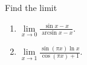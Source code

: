 Find the limit
\begin{enumerate}
\item $\lim\limits_{x\to 0} \frac{\sin x-x }{\arcsin x-x } $.
\item $\lim\limits_{x\to 1} \frac{\sin \left(\pi x\right)\ln x }{\cos(\pi x)+1 } $.
\end{enumerate}